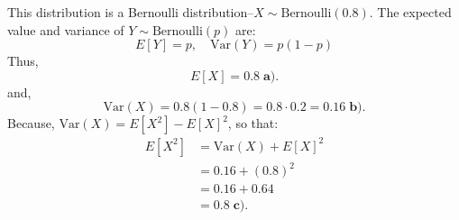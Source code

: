 \documentclass[a4paper, 10pt]{article}
\begin{document}
\begin{solution}
This distribution is a Bernoulli distribution--\( X \sim \text{Bernoulli}(0.8) \).
The expected value and variance of \( Y \sim \text{Bernoulli}(p) \) are:
\[
    E[Y] = p, \quad \text{Var}(Y) = p(1 - p)
\]
Thus,
\[
    E[X] = \boxed{0.8} \; \textbf{a).}
\]
and,
\[
    \text{Var}(X) = 0.8(1 - 0.8) = 0.8 \cdot 0.2 = \boxed{0.16} \; \textbf{b).}
\]
Because, \( \text{Var}(X) = E[X^2] - E[X]^2 \), so that:
\begin{align*}  
    E[X^2] &= \text{Var}(X) + E[X]^2 \\
    &= 0.16 + (0.8)^2 \\
    &= 0.16 + 0.64 \\
    &= \boxed{0.8} \; \textbf{c).}
\end{align*}
\end{solution}
\end{document}
